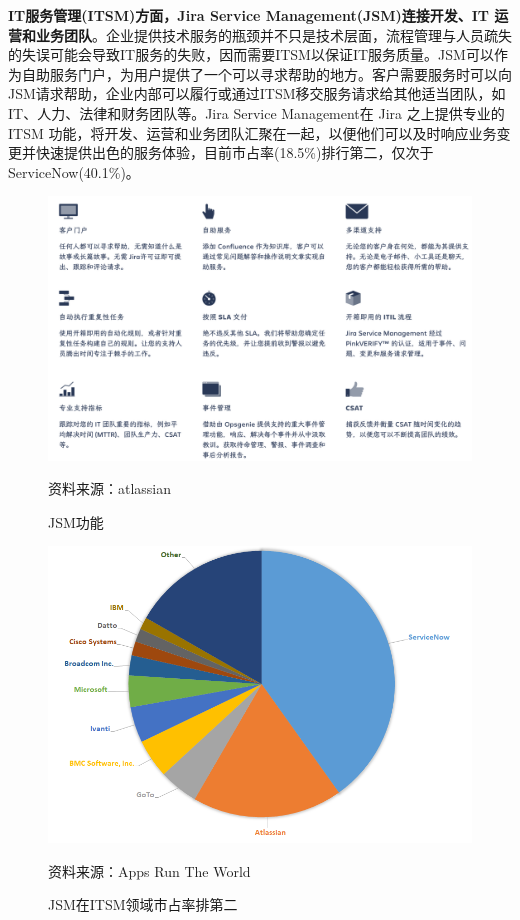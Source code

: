 \textbf{IT服务管理(ITSM)方面，Jira Service Management(JSM)连接开发、IT 运营和业务团队}。企业提供技术服务的瓶颈并不只是技术层面，流程管理与人员疏失的失误可能会导致IT服务的失败，因而需要ITSM以保证IT服务质量。JSM可以作为自助服务门户，为用户提供了一个可以寻求帮助的地方。客户需要服务时可以向JSM请求帮助，企业内部可以履行或通过ITSM移交服务请求给其他适当团队，如IT、人力、法律和财务团队等。Jira Service Management在 Jira 之上提供专业的 ITSM 功能，将开发、运营和业务团队汇聚在一起，以便他们可以及时响应业务变更并快速提供出色的服务体验，目前市占率(18.5\%)排行第二，仅次于ServiceNow(40.1\%)。
\begin{figure}[H]
    \caption{JSM功能}
    \begin{center}
        \includegraphics[width=0.9\linewidth]{img/ITSM.png}
    \end{center}
    \footnotesize{资料来源：atlassian}
\end{figure}
\begin{figure}[H]
    \caption{JSM在ITSM领域市占率排第二}
    \begin{center}
        \includegraphics[width=0.9\linewidth]{img/JSM.png}
    \end{center}
    \footnotesize{资料来源：Apps Run The World}
\end{figure}

